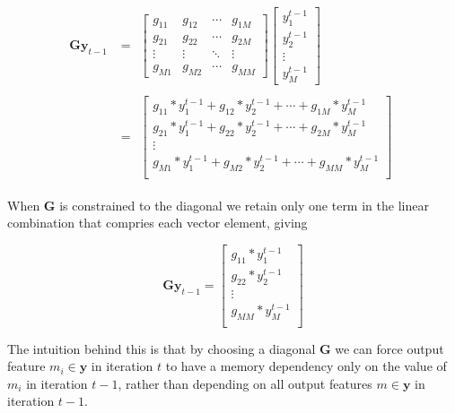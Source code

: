 \documentclass[12pt]{article}
\begin{document}
\begin{align}
	\boldsymbol{G}\boldsymbol{y}_{t-1}
	&=
	\begin{aligned}
		\begin{bmatrix}
			g_{11} & g_{12} & \cdots & g_{1M} \\
			g_{21} & g_{22} & \cdots & g_{2M} \\
			\vdots & \vdots & \ddots & \vdots \\
			g_{M1} & g_{M2} & \cdots & g_{MM}
		\end{bmatrix}
		\begin{bmatrix}
			y^{t-1}_{1} \\
			y^{t-1}_{2} \\
			\vdots \\
			y^{t-1}_{M}
		\end{bmatrix}
	\end{aligned}
	\\
	&=
	\begin{aligned}
		\begin{bmatrix}
			g_{11}*y^{t-1}_{1} + g_{12}*y^{t-1}_{2} + \cdots + g_{1M}*y^{t-1}_{M} \\
			g_{21}*y^{t-1}_{1} + g_{22}*y^{t-1}_{2} + \cdots + g_{2M}*y^{t-1}_{M} \\
			\vdots \\
			g_{M1}*y^{t-1}_{1} + g_{M2}*y^{t-1}_{2} + \cdots + g_{MM}*y^{t-1}_{M} \\
		\end{bmatrix}
	\end{aligned}
\end{align}

When $\boldsymbol{G}$ is constrained to the diagonal we retain only one term in
the linear combination that compries each vector element, giving

\begin{equation}
	\boldsymbol{G}\boldsymbol{y}_{t-1}
	=
	\begin{bmatrix}
		g_{11}*y^{t-1}_{1} \\
		g_{22}*y^{t-1}_{2} \\
		\vdots \\
		g_{MM}*y^{t-1}_{M} \\
	\end{bmatrix}
\end{equation}

The intuition behind this is that by choosing a diagonal $\boldsymbol{G}$ we
can force output feature $m_i \in \boldsymbol{y}$ in iteration $t$
to have a memory dependency
only on the value of $m_i$ in iteration $t-1$, rather than depending on
all output features $m \in \boldsymbol{y}$ in iteration $t-1$.
\end{document}
